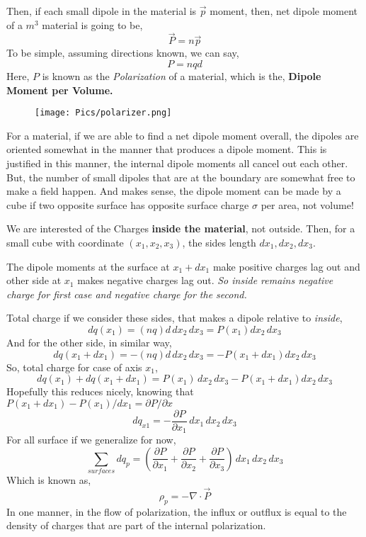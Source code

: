 \documentclass[12pt,a4paper]{memoir}
\begin{document}
Then, if each small dipole in the material is $\vec{p}$ moment, then, net dipole moment of a $m^3$ material is going to be,
\[ \vec{P} = n \vec{p} \]
To be simple, assuming directions known, we can say,
\begin{equation}
P = nq d
\end{equation}
Here, $P$ is known as the \emph{Polarization} of a material, which is the, \textbf{Dipole Moment per Volume.}
\begin{figure}[ht!]
    \centering
    \texttt{[image: Pics/polarizer.png]}
    \caption{}
    \label{fig:}
\end{figure}
For a material, if we are able to find a net dipole moment overall, the dipoles are oriented somewhat in the manner that produces a dipole moment. This is justified in this manner, the internal dipole moments all cancel out each other. But, the number of small dipoles that are at the boundary are somewhat free to make a field happen. And makes sense, the dipole moment can be made by a cube if two opposite surface has opposite surface charge $\sigma$ per area, not volume! 

We are interested of the Charges \textbf{inside the material}, not outside. Then, for a small cube with coordinate $(x_1,x_2,x_3)$, the sides length $dx_1,dx_2,dx_3$.

The dipole moments at the surface at $x_1 + dx_1$ make positive charges lag out and other side at $x_1$ makes negative charges lag out.\textit{ So inside remains negative charge for first case and negative charge for the second.}

Total charge if we consider these sides, that makes a dipole relative to \textit{inside},
\[dq(x_1) =  (nq) d \, dx_2 \,dx_3 = P(x_1) dx_2 \,dx_3\]
And for the other side, in similar way,
\[dq(x_1 + dx_1) = - (nq) d \, dx_2 \,dx_3 =- P(x_1 + dx_1) dx_2 \,dx_3\]
So, total charge for case of axis $x_1$,
\[ dq(x_1)+dq(x_1 + dx_1)= P(x_1) \, dx_2 \,dx_3 -P(x_1 + dx_1) dx_2 \,dx_3 \]
Hopefully this reduces nicely, knowing that $ P(x_1 + dx_1) - P(x_1) / dx_1 = \partial P/ \partial x $
\begin{equation}
dq_{x1} =- \frac{ \partial P}{\partial x_1} \, dx_1 \, dx_2\, dx_3
\end{equation}
For all surface if we generalize for now,
\begin{equation}
\sum_{surfaces} dq_{p} = \left(  \frac{ \partial P}{\partial x_1} +
 \frac{ \partial P}{\partial x_2} +
  \frac{ \partial P}{\partial x_3}   \right) \, dx_1 \, dx_2\, dx_3
\end{equation}
Which is known as,
\begin{equation}
\rho _p = - \nabla \cdot \vec{ P }
\end{equation}
In one manner, in the flow of polarization, the influx or outflux is equal to the density of charges that are part of the internal polarization.
\end{document}
